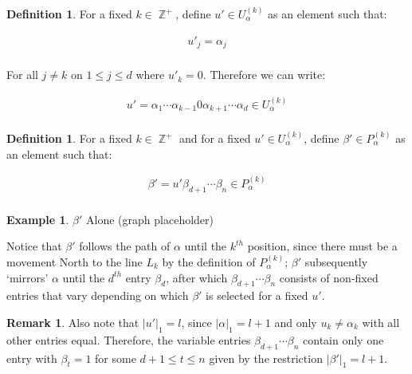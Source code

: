 \documentclass[12pt,reqno]{amsart}
\theoremstyle{plain}
\theoremstyle{definition}
\newtheorem{example}[theorem]{Example}
\newtheorem{remark}[theorem]{Remark}
\newtheorem{definition}[theorem]{Definition}
\DeclareMathOperator{\Z}{\mathbb{Z}}
\begin{document}
\begin{definition} \label{uprimes}
For a fixed $k \in \Z ^+$, define $u' \in U_\alpha^{(k)}$ as an element such that:

\begin{align*}
    u'_j = \alpha_j \\
\end{align*}

For all $j \ne k$ on $1 \leq j \leq d$ where $u'_k = 0$. Therefore we can write:

\begin{align*}
u' = \alpha_1 \cdots \alpha_{k-1} 0 \alpha_{k+1} \cdots \alpha_d    \in U_\alpha^{(k)} \\
\end{align*}

\end{definition}


\begin{definition} \label{bprimes}
For a fixed $k \in \Z ^+$ and for a fixed $u' \in U_\alpha^{(k)}$, define $\beta' \in P_\alpha^{(k)}$ as an element such that:

\begin{align*}
    \beta' = u' \beta_{d+1} \cdots \beta_n \in P_\alpha^{(k)} \\
\end{align*}

\end{definition}





\begin{example} \label{bprime_before}
    $\beta'$ Alone (graph placeholder)
\end{example}



Notice that $\beta'$ follows the path of $\alpha$ until the $k^{th}$ position, since there must be a movement North to the line $L_k$ by the definition of $P_\alpha^{(k)}$; $\beta'$ subsequently `mirrors' $\alpha$ until the $d^{th}$ entry $\beta_d$, after which $\beta_{d+1} \cdots \beta_n$ consists of non-fixed entries that vary depending on which $\beta'$ is selected for a fixed $u'$. 



\begin{remark} \label{bprime_ones}
    Also note that $|u'|_1 = l$, since $|\alpha|_1 = l+1$ and only $u_k \ne \alpha_k$ with all other entries equal. Therefore, the variable entries $\beta_{d+1} \cdots \beta_n$ contain only one entry with $\beta_{t} = 1$ for some $d+1 \leq t \leq n$ given by the restriction $|\beta'|_1 = l+1$.
\end{remark}
\end{document}
